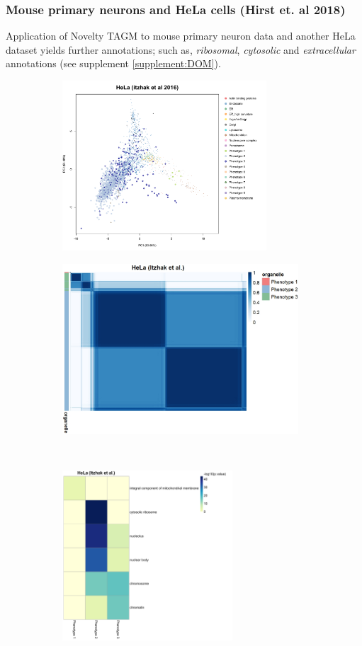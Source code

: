 \documentclass[12pt,english]{article}
\begin{document}
\subsubsection{Mouse primary neurons and HeLa cells (Hirst et. al 2018)}
Application of Novelty TAGM to mouse primary neuron data \citep{Itzhak::2017} and another HeLa dataset \citep{Hirst:2018} yields further annotations; such as, \textit{ribosomal}, \textit{cytosolic} and \textit{extracellular} annotations (see supplement \ref{supplement:DOM}). 
\begin{figure}
	\begin{subfigure}[t]{0.5\textwidth}
		\centering
		\includegraphics[height=2.5in]{pcaItzhak2016.pdf}
		\caption{}
	\end{subfigure}
	\begin{subfigure}[t]{0.5\textwidth}
		\centering
		\includegraphics[height=2.5in]{itzhak2016heatmap.jpeg}
		\caption{}
	\end{subfigure}
~
	\begin{subfigure}[t]{\textwidth}
	\centering
	\includegraphics[height=2.5in]{pvalueItzhak}

\end{subfigure}
\end{figure}
\end{document}
